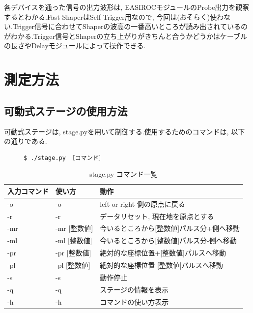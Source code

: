 各デバイスを通った信号の出力波形は, EASIROCモジュールのProbe出力を観察するとわかる.Fast ShaperはSelf Trigger用なので, 今回は(おそらく)使わない.Trigger信号に合わせてShaperの波高の一番高いところが読み出されているのがわかる.Trigger信号とShaperの立ち上がりがきちんと合うかどうかはケーブルの長さやDelayモジュールによって操作できる.

\clearpage
\section{測定方法}

\subsection{可動式ステージの使用方法}

可動式ステージは, stage.pyを用いて制御する.使用するためのコマンドは, 以下の通りである.
\begin{figure}[H]
  \begin{lstlisting}[caption=stage.pyのコマンド]
$ ./stage.py ［コマンド］  
  \end{lstlisting}
\end{figure}


\begin{table}[H]
  \begin{center}
    \caption{stage.py コマンド一覧}
    \begin{tabular}{|l|l|l|} \hline
      入力コマンド & 使い方       & 動作                                      \\ \hline \hline
      -o           & -o           & left or right 側の原点に戻る              \\ \hline
      -r           & -r           & データリセット, 現在地を原点とする        \\ \hline
      -mr          & -mr [整数値] & 今いるところから[整数値]パルス分+側へ移動 \\ \hline
      -ml          & -ml [整数値] & 今いるところから[整数値]パルス分-側へ移動 \\ \hline
      -pr          & -pr [整数値] & 絶対的な座標位置+[整数値]パルスへ移動     \\ \hline
      -pl          & -pl [整数値] & 絶対的な座標位置-[整数値]パルスへ移動     \\ \hline
      -s           & -s           & 動作停止                                  \\ \hline
      -q           & -q           & ステージの情報を表示                      \\ \hline
      -h           & -h           & コマンドの使い方表示                      \\ \hline
    \end{tabular}
  \end{center}
\end{table}

